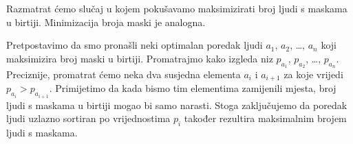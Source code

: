 \documentclass[a4paper]{article}
\begin{document}
Razmatrat ćemo slučaj u kojem pokušavamo maksimizirati broj ljudi s maskama
u birtiji. Minimizacija broja maski je analogna.

Pretpostavimo da smo pronašli neki optimalan poredak ljudi $a_1$, $a_2$, \ldots,
$a_n$ koji maksimizira broj maski u birtiji. Promatrajmo kako izgleda niz
$p_{a_1}$, $p_{a_2}$, \ldots, $p_{a_n}$. Preciznije, promatrat ćemo neka dva
susjedna elementa $a_i$ i $a_{i+1}$ za koje vrijedi $p_{a_i} > p_{a_{i+1}}$.
Primijetimo da kada bismo tim elementima zamijenili mjesta, broj ljudi s
maskama u birtiji mogao bi samo narasti. Stoga zaključujemo da poredak ljudi
uzlazno sortiran po vrijednostima $p_i$ također rezultira maksimalnim brojem
ljudi s maskama.
\end{document}
